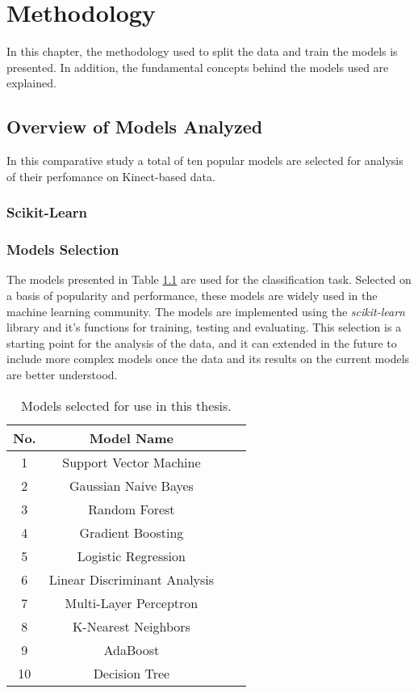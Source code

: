 %
%
\chapter{Methodology}
\hypersetup{colorlinks=true, linkcolor=red}
    In this chapter, the methodology used to split the data and train the models is presented. In addition, the fundamental concepts behind the models used are explained.
    \section{Overview of Models Analyzed}
        In this comparative study a total of ten popular models are selected for analysis of their perfomance on Kinect-based data.
        \subsection{Scikit-Learn}  
        \subsection{Models Selection}
        The models presented in Table \ref{tab:movement_table} are used for the classification task. Selected on a basis of popularity and performance, these models are widely used in the machine learning community. The models are implemented using the \textit{scikit-learn} library and it's functions for training, testing and evaluating\cite{sklearn_api}. This selection is a starting point for the analysis of the data, and it can extended in the future to include more complex models once the data and its results on the current models are better understood.

        \begin{table}[ht]
            \centering
                \begin{tabular}{@{}cccc@{}}
                    \toprule
                    \textbf{No.} & \textbf{Model Name}\\
                    \midrule
                    1 & Support Vector Machine \\
                    2 & Gaussian Naive Bayes \\
                    3 & Random Forest \\
                    4 & Gradient Boosting \\
                    5 & Logistic Regression \\
                    6 & Linear Discriminant Analysis \\
                    7 & Multi-Layer Perceptron \\
                    8 & K-Nearest Neighbors \\
                    9 & AdaBoost \\
                    10 & Decision Tree \\
                    \bottomrule
                \end{tabular}
                \caption{Models selected for use in this thesis.}
                \label{tab:movement_table}
        \end{table}  

